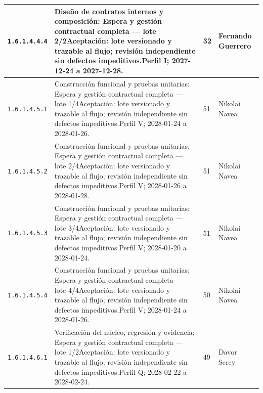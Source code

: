 \begin{longtable}{L{29mm}L{80mm}R{12mm}L{28mm}}
\texttt{1.\allowbreak{}6.\allowbreak{}1.\allowbreak{}4.\allowbreak{}4.\allowbreak{}4} & Diseño de contratos internos y composición: Espera y gestión contractual completa — lote 2/2\newline Aceptación: lote versionado y trazable al flujo; revisión independiente sin defectos impeditivos.\newline Perfil I; 2027-12-24 a 2027-12-28. & 32 & Fernando Guerrero\\\hline
\texttt{1.\allowbreak{}6.\allowbreak{}1.\allowbreak{}4.\allowbreak{}5.\allowbreak{}1} & Construcción funcional y pruebas unitarias: Espera y gestión contractual completa — lote 1/4\newline Aceptación: lote versionado y trazable al flujo; revisión independiente sin defectos impeditivos.\newline Perfil V; 2028-01-24 a 2028-01-26. & 51 & Nikolai Navea\\\hline
\texttt{1.\allowbreak{}6.\allowbreak{}1.\allowbreak{}4.\allowbreak{}5.\allowbreak{}2} & Construcción funcional y pruebas unitarias: Espera y gestión contractual completa — lote 2/4\newline Aceptación: lote versionado y trazable al flujo; revisión independiente sin defectos impeditivos.\newline Perfil V; 2028-01-26 a 2028-01-28. & 51 & Nikolai Navea\\\hline
\texttt{1.\allowbreak{}6.\allowbreak{}1.\allowbreak{}4.\allowbreak{}5.\allowbreak{}3} & Construcción funcional y pruebas unitarias: Espera y gestión contractual completa — lote 3/4\newline Aceptación: lote versionado y trazable al flujo; revisión independiente sin defectos impeditivos.\newline Perfil V; 2028-01-20 a 2028-01-24. & 51 & Nikolai Navea\\\hline
\texttt{1.\allowbreak{}6.\allowbreak{}1.\allowbreak{}4.\allowbreak{}5.\allowbreak{}4} & Construcción funcional y pruebas unitarias: Espera y gestión contractual completa — lote 4/4\newline Aceptación: lote versionado y trazable al flujo; revisión independiente sin defectos impeditivos.\newline Perfil V; 2028-01-24 a 2028-01-26. & 50 & Nikolai Navea\\\hline
\texttt{1.\allowbreak{}6.\allowbreak{}1.\allowbreak{}4.\allowbreak{}6.\allowbreak{}1} & Verificación del núcleo, regresión y evidencia: Espera y gestión contractual completa — lote 1/2\newline Aceptación: lote versionado y trazable al flujo; revisión independiente sin defectos impeditivos.\newline Perfil Q; 2028-02-22 a 2028-02-24. & 49 & Davor Serey\\\hline

\end{longtable}
